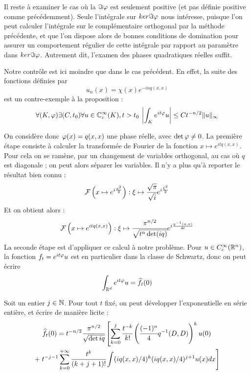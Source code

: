 Il reste à examiner le cas où la $\Im \varphi$ est seulement positive (et pas définie positive comme précédemment). Seule l'intégrale sur $ker \Im \varphi$ nous intéresse, puisque l'on peut calculer l'intégrale sur le complémentaire orthogonal par la méthode précédente, et que l'on dispose alors de bonnes conditions de domination pour assurer un comportement régulier de cette intégrale par rapport au paramètre dans $ker \Im \varphi$. Autrement dit, l'examen des phases quadratiques réelles suffit.

Notre contrôle est ici moindre que dans le cas précédent. En effet, la suite des fonctions définies par
\begin{equation*}
  u_n(x)=\chi(x)e^{-inq(x,x)}
\end{equation*}
est un contre-exemple à la proposition :
\begin{equation*}
  \forall (K,\varphi) \exists (C,t_0) \forall u \in \mathbb{C}^{\infty}_c(K),t>t_0\: \left|\int_Ke^{it\varphi}u\right| \leq Ct^{-n/2}\|u\|_{\infty}
\end{equation*}

On considère donc $\varphi(x)=q(x,x)$ une phase réelle, avec $\det \varphi \neq 0$. La première étape consiste à calculer la transformée de Fourier de la fonction $x\mapsto e^{itq(x,x)}$. Pour cela on se ramène, par un changement de variables orthogonal, au cas où $q$ est diagonale ; on peut alors séparer les variables. Il n'y a plus qu'à reporter le résultat bien connu :
\begin{equation*}
  \mathcal{F}\left(x\mapsto e^{i\frac{x^2}{2}}\right) : \xi \mapsto
  \cfrac{\sqrt{\pi}}{\sqrt{i}} e^{i\frac{\xi^2}{2}}
\end{equation*}
\noindent Et on obtient alors :
\begin{equation*}
  \mathcal{F}\left(x\mapsto e^{itq(x,x)}\right) : \xi \mapsto \cfrac{\pi^{n/2}}{\sqrt{t^n \det (iq)}}e^{i\frac{q^{-1}(x,x)}{4t}}
\end{equation*}
La seconde étape est d'appliquer ce calcul à notre problème. Pour $u \in C^{\infty}_c(\mathbb{R}^n)$, la fonction $f_t=e^{it\varphi}u$ est en particulier dans la classe de Schwartz, donc on peut écrire
\begin{equation*}
  \int_{\mathbb{R}^d}e^{it\varphi}u = \widehat{f_t}(0)
\end{equation*}

Soit un entier $j \in \mathbb{N}$. Pour tout $t$ fixé, on peut développer l'exponentielle en série entière, et écrire de manière licite :
\begin{multline*}
  \widehat{f_t}(0)=t^{-n/2}\cfrac{\pi^{n/2}}{\sqrt{\det{iq}}}\left[\sum_{k=0}^{j}\cfrac{t^{-k}}{k!}\left(\cfrac{(-1)^n}{4}q^{-1}(D,D)\right)^ku(0)\right. \\+ \left.t^{-j-1}\sum_{k=0}^{+\infty}\cfrac{t^k}{(k+j+1)!}\int (iq(x,x)/4)^k(iq(x,x)/4)^{j+1}u(x)dx\right]
\end{multline*}

